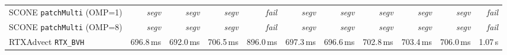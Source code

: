\begin{table}[t]
\begin{tabular}{lrrrrrrrrrr}
SCONE \texttt{patchMulti} (OMP=1) & \textit{segv} & \textit{segv} & \textit{segv} & \textit{fail} & \textit{segv} & \textit{segv} & \textit{segv} & \textit{segv} & \textit{segv} & \textit{fail} \\
SCONE \texttt{patchMulti} (OMP=8) & \textit{segv} & \textit{segv} & \textit{segv} & \textit{fail} & \textit{segv} & \textit{segv} & \textit{segv} & \textit{segv} & \textit{segv} & \textit{fail} \\
\midrule
RTXAdvect \texttt{RTX\_BVH} & 696.8\,ms & 692.0\,ms & 706.5\,ms & 896.0\,ms & 697.3\,ms & 696.6\,ms & 702.8\,ms & 703.4\,ms & 706.0\,ms & 1.07\,s \\
\bottomrule
\end{tabular}
\end{table}
